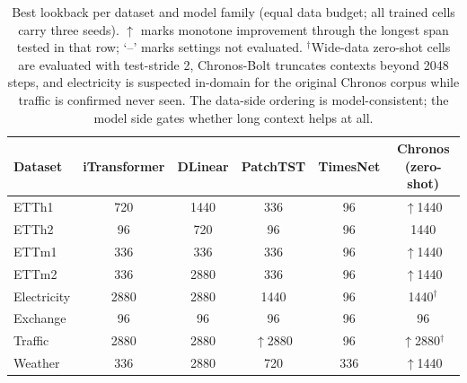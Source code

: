 \begin{table}[t]
\caption{Best lookback per dataset and model family (equal data budget; all trained cells carry three seeds). $\uparrow$ marks monotone improvement through the longest span tested in that row; `--' marks settings not evaluated. $^{\dagger}$Wide-data zero-shot cells are evaluated with test-stride 2, Chronos-Bolt truncates contexts beyond 2048 steps, and electricity is suspected in-domain for the original Chronos corpus while traffic is confirmed never seen. The data-side ordering is model-consistent; the model side gates whether long context helps at all.}
\label{tab:bestl}
\centering\scriptsize
\begin{tabular}{lccccc}
\toprule
Dataset & iTransformer & DLinear & PatchTST & TimesNet & Chronos (zero-shot) \\
\midrule
ETTh1 & 720 & 1440 & 336 & 96 & $\uparrow$1440 \\
ETTh2 & 96 & 720 & 96 & 96 & 1440 \\
ETTm1 & 336 & 336 & 336 & 96 & $\uparrow$1440 \\
ETTm2 & 336 & 2880 & 336 & 96 & $\uparrow$1440 \\
Electricity & 2880 & 2880 & 1440 & 96 & 1440$^{\dagger}$ \\
Exchange & 96 & 96 & 96 & 96 & 96 \\
Traffic & 2880 & 2880 & $\uparrow$2880 & 96 & $\uparrow$2880$^{\dagger}$ \\
Weather & 336 & 2880 & 720 & 336 & $\uparrow$1440 \\
\bottomrule
\end{tabular}
\end{table}
